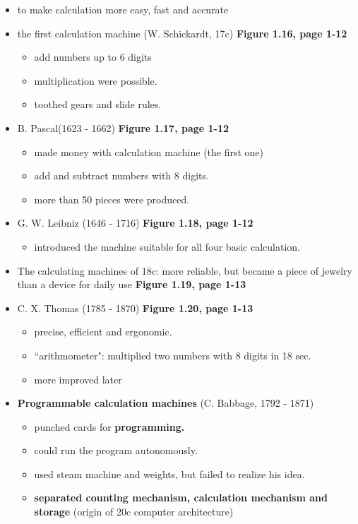 \documentclass{standalone}
\begin{document}
\begin{itemize}
	\item to make calculation more easy, fast and accurate
	\item the first calculation machine (W. Schickardt, 17c) \textbf{Figure 1.16, page 1-12}
		\begin{itemize}
			\item add numbers up to 6 digits
			\item multiplication were possible. 
			\item toothed gears and slide rules. 
		\end{itemize}
	\item B. Pascal(1623 - 1662) \textbf{Figure 1.17, page 1-12}
		\begin{itemize}
			\item made money with calculation machine (the first one) 
			\item add and subtract numbers with 8 digits. 
			\item more than 50 pieces were produced. 
		\end{itemize}
	\item G. W. Leibniz (1646 - 1716) \textbf{Figure 1.18, page 1-12}
		\begin{itemize}
			\item introduced the machine suitable for all four basic calculation. 
		\end{itemize} 
	\item The calculating machines of 18c: more reliable, but became a piece of jewelry than a device for daily use \textbf{Figure 1.19, page 1-13}
	\item C. X. Thomas (1785 - 1870) \textbf{Figure 1.20, page 1-13}
		\begin{itemize}
			\item precise, efficient and ergonomic.
			\item ``arithmometer": multiplied two numbers with 8 digits in 18 sec.
			\item more improved later 	
		\end{itemize}
	\item \textbf{Programmable calculation machines} (C. Babbage, 1792 - 1871)
		\begin{itemize}
			\item punched cards for \textbf{programming.} 
			\item could run the program autonomously.
			\item used steam machine and weights, but failed to realize his idea. 
			\item \textbf{separated counting mechanism, calculation mechanism and storage} (origin of 20c computer architecture)

\end{itemize}
\end{itemize}
\end{document}
